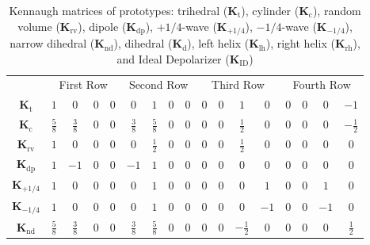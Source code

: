 \documentclass[journal]{IEEEtran}
\begin{document}
	
	\begin{table}[hbt]
		\centering
		\caption{Kennaugh matrices of prototypes: {trihedral} ($\bm{K}_{\text{t}}$),
			{cylinder} ($\bm{K}_{\text{c}}$),
			{random volume} ($\bm{K}_{\text{rv}}$),
			{dipole} ($\bm{K}_{\text{dp}}$),
			{$+1/4$-wave} ($\bm{K}_{+1/4}$), 
			{$-1/4$-wave} ($\bm{K}_{-1/4}$),
			{narrow dihedral} ($\bm{K}_{\text{nd}}$),
			{dihedral} ($\bm{K}_{\text{d}}$),
			{left helix} ($\bm{K}_{\text{lh}}$), 
			{right helix} ($\bm{K}_{\text{rh}}$), 
			and Ideal Depolarizer ($\bm{K}_{\text{ID}}$)}\label{Tab:ElementaryK}
		\setlength{\tabcolsep}{2.7pt}
		\renewcommand{\arraystretch}{1.3}
		\begin{tabular}{*{17}{c}}\toprule
			&	\multicolumn{4}{c}{First Row} 
			& \multicolumn{4}{c}{Second Row} 
			& \multicolumn{4}{c}{Third Row} 
			& \multicolumn{4}{c}{Fourth Row}\\ 
			\cmidrule(rl){2-5} \cmidrule(rl){6-9} \cmidrule(rl){10-13} \cmidrule(rl){14-17} 
			$\bm K_{\text{t}}$
			& $1$ & $0$ & $0$ & $0$
			& $0$ & $1$ & $0$ & $0$
			& $0$ & $0$ & $1$ & $0$
			& $0$ & $0$ & $0$ & $-1$ \\
			$\bm K_{\text{c}}$
			& $\frac{5}{8}$ & $\frac{3}{8}$ & $0$ & $0$
			& $\frac{3}{8}$ & $\frac{5}{8}$ & $0$ & $0$
			& $0$ & $0$ & $\frac{1}{2}$ & $0$
			& $0$ & $0$ & $0$ & $-\frac{1}{2}$\\
			$\bm K_{\text{rv}}$ 
			& $1$ & $0$ & $0$ & $0$
			& $0$ & $\frac{1}{2}$ & $0$ & $0$
			& $0$ & $0$ & $\frac{1}{2}$ & $0$
			& $0$ & $0$ & $0$ & $0$\\
			$\bm K_\text{dp}$
			& $1$ & $-1$ & $0$ & $0$
			& $-1$ & $1$ & $0$ & $0$
			& $0$ & $0$ & $0$ & $0$
			& $0$ & $0$ & $0$ & $0$\\
			$\bm K_{+1/4}$
			& $1$ & $0$ & $0$ & $0$
			& $0$ & $1$ & $0$ & $0$
			& $0$ & $0$ & $0$ & $1$
			& $0$ & $0$ & $1$ & $0$\\
			$\bm K_{-1/4}$
			& $1$ & $0$ & $0$ & $0$
			& $0$ & $1$ & $0$ & $0$
			& $0$ & $0$ & $0$ & $-1$
			& $0$ & $0$ & $-1$ & $0$\\
			$\bm K_{\text{nd}}$ 
			&$\frac{5}{8}$ & $\frac{3}{8}$ & $0$ & $0$
			& $\frac{3}{8}$ & $\frac{5}{8}$ & $0$ & $0$
			& $0$ & $0$ & $-\frac{1}{2}$ & $0$
			& $0$ & $0$ & $0$ & $\frac{1}{2}$\\

\end{tabular}
\end{table}
\end{document}
